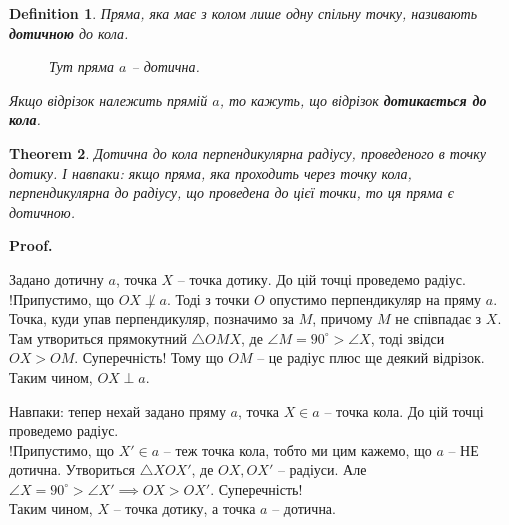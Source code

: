 \documentclass[a4paper, 10pt]{article}
\makeatletter
\theoremstyle{theoremdd}
\newtheorem{theorem}{Theorem}[subsection]
\theoremstyle{theoremdd}
\theoremstyle{theoremdd}
\newtheorem{definition}[theorem]{Definition}
\theoremstyle{theoremdd}
\theoremstyle{theoremdd}
\theoremstyle{theoremdd}
\theoremstyle{theoremdd}
\theoremstyle{theoremdd}
\theoremstyle{theoremdd}
\renewenvironment{proof}[1][Proof.\\]{\par
\pushQED{\hfill \qed}%
\normalfont \topsep6\p@\@plus6\p@\relax
\trivlist
\item\relax
{\bfseries
#1\@addpunct{.}}\hspace\labelsep\ignorespaces
}{%
\popQED\endtrivlist\@endpefalse
}
\makeatother
\begin{document}
\begin{definition}
Пряма, яка має з колом лише одну спільну точку, називають \textbf{дотичною} до кола.
\begin{figure}[H]
\centering
{}
\caption*{Тут пряма $a$ -- дотична.}
\end{figure}
Якщо відрізок належить прямій $a$, то кажуть, що відрізок \textbf{дотикається до кола}.
\end{definition}

\begin{theorem}
Дотична до кола перпендикулярна радіусу, проведеного в точку дотику. І навпаки: якщо пряма, яка проходить через точку кола, перпендикулярна до радіусу, що проведена до цієї точки, то ця пряма є дотичною.
\end{theorem}

\begin{proof}
Задано дотичну $a$, точка $X$ -- точка дотику. До цій точці проведемо радіус.\\
!Припустимо, що $OX \not \perp a$. Тоді з точки $O$ опустимо перпендикуляр на пряму $a$. Точка, куди упав перпендикуляр, позначимо за $M$, причому $M$ не співпадає з $X$.\\
Там утвориться прямокутний $\triangle OMX$, де $\angle M = 90^\circ > \angle X$, тоді звідси $OX > OM$. Суперечність! Тому що $OM$ -- це радіус плюс ще деякий відрізок.\\
Таким чином, $OX \perp a$.
\begin{figure}[H]
\centering
{}
\end{figure}
Навпаки: тепер нехай задано пряму $a$, точка $X \in a$ -- точка кола. До цій точці проведемо радіус.\\
!Припустимо, що $X' \in a$ -- теж точка кола, тобто ми цим кажемо, що $a$ -- НЕ дотична. Утвориться $\triangle XOX'$, де $OX,OX'$ -- радіуси. Але $\angle X = 90^\circ > \angle X' \implies OX > OX'$. Суперечність!\\
Таким чином, $X$ -- точка дотику, а точка $a$ -- дотична.
\end{proof}
\end{document}
